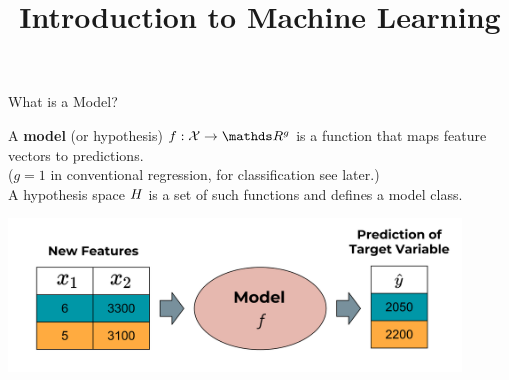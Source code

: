 \documentclass[11pt,compress,t,notes=noshow, xcolor=table]{beamer}
\title{Introduction to Machine Learning}
\institute{\href{https://compstat-lmu.github.io/lecture_i2ml/}{compstat-lmu.github.io/lecture\_i2ml}}
\date{}
\begin{document}
















\begin{frame}{What is a Model?}


A \textbf{model} (or hypothesis) $f : \Xspace \rightarrow \R^g$ is a function that maps feature vectors to predictions.\\
($g=1$ in conventional regression, for classification see later.)\\
A hypothesis space $H$ is a set of such functions and defines a model class.

\begin{center}\includegraphics[width=0.9\textwidth]{figure_man/the_model_web} \end{center}

\end{frame}
\end{document}
